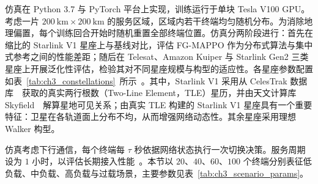 仿真在 Python 3.7 与 PyTorch 平台上实现，训练运行于单块 Tesla V100 GPU。考虑一片 $200~\mathrm{km}\times200~\mathrm{km}$ 的服务区域，区域内若干终端均匀随机分布。为消除地理偏置，每个训练回合开始时随机重置全部终端位置。仿真分两阶段进行：首先在缩比的 Starlink V1 星座上与基线对比，评估 FG-MAPPO 作为分布式算法与集中式参考之间的性能差距；随后在 Telesat、Amazon Kuiper 与 Starlink Gen2 三类星座上开展泛化性评估，检验其对不同星座规模与构型的适应性。各星座参数配置如表~\ref{tab:ch3_constellations}~所示~\cite{ji-SpaceGroundMM-TWC24}。其中，Starlink V1 采用从 CelesTrak 数据库~\cite{celestrak-db}~获取的真实两行根数（Two-Line Element，TLE）星历，并由天文计算库 Skyfield~\cite{skyfield-lib}~解算星地可见关系；由真实 TLE 构建的 Starlink V1 星座具有一个重要特征：卫星在各轨道面上分布不均，从而增强网络动态性。其余星座采用理想 Walker 构型。

\begin{table}[!htp]
  \centering
  \label{tab:ch3_constellations}
\end{table}

仿真考虑下行通信，每个终端每 $\tau$ 秒依据网络状态执行一次切换决策。服务周期设为 $1$ 小时，以评估长期接入性能~\cite{lee-HOProtocolLearning-TWC24,wang-SeamlessHO-TComm23}。本节以 $20$、$40$、$60$、$100$ 个终端分别表征低负载、中负载、高负载与过载场景，主要参数见表~\ref{tab:ch3_scenario_params}。

